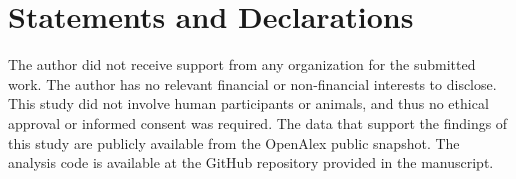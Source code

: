 \documentclass[pdflatex,sn-apa]{sn-jnl}%
\begin{document}





\section*{Statements and Declarations}
The author did not receive support from any organization for the submitted work.
The author has no relevant financial or non-financial interests to disclose.
This study did not involve human participants or animals, and thus no ethical approval or informed consent was required.
The data that support the findings of this study are publicly available from the OpenAlex public snapshot. The analysis code is available at the GitHub repository provided in the manuscript.

\end{document}
